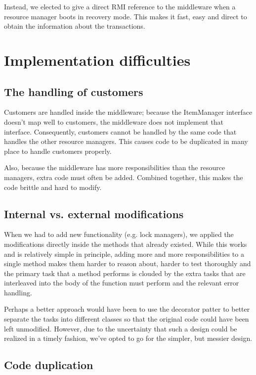 \documentclass[11pt]{article}
\begin{document}
Instead, we elected to give a direct RMI reference to the middleware
when a resource manager boots in recovery mode.  This makes it fast,
easy and direct to obtain the information about the transactions.



\section{Implementation difficulties}

\subsection{The handling of customers}

Customers are handled inside the middleware; because the ItemManager
interface doesn't map well to customers, the middleware does not
implement that interface.  Consequently, customers cannot be handled
by the same code that handles the other resource managers.  This
causes code to be duplicated in many place to handle customers
properly.

Also, because the middleware has more responsibilities than the
resource managers, extra code must often be added.  Combined together,
this makes the code brittle and hard to modify.

\subsection{Internal vs. external modifications}

When we had to add new functionality (e.g. lock managers), we applied
the modifications directly inside the methods that already existed.
While this works and is relatively simple in principle, adding more
and more responsibilities to a single method makes them harder to
reason about, harder to test thoroughly and the primary task that a
method performs is clouded by the extra tasks that are interleaved
into the body of the function must perform and the relevant error
handling.

Perhaps a better approach would have been to use the decorator patter
to better separate the tasks into different classes so that the
original code could have been left unmodified.  However, due to the
uncertainty that such a design could be realized in a timely fashion,
we've opted to go for the simpler, but messier design.

\subsection{Code duplication}
\end{document}
